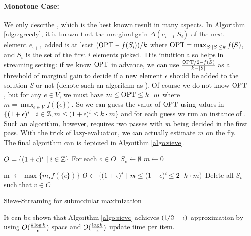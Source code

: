\paragraph{Monotone Case:} We only describe \cite{BMK+14}, which is the best known result in many aspects.  In Algorithm \ref{algo:greedy}, it is known that the marginal gain $\Delta(e_{i+1}|S_i)$ of the next element $e_{i+1}$ added is at least $(\text{OPT} - f(S_i))/k$ where $\text{OPT}=\max_{S:|S|\leq k} f(S)$, and $S_i$ is the set of the first $i$ elements picked. This intuition also helps in streaming setting: if we know $\text{OPT}$ in advance, we can use $\frac{\text{OPT}/2 - f(S)}{k - |S|}$ as a  threshold of marginal gain to decide if a new element $e$ should be added to the solution $S$ or not (denote such an algorithm as \knowopt). Of course we do not know $\text{OPT}$, but for any $e\in V$, we must have $m \leq \text{OPT} \leq k\cdot m$ where $m = \max_{e\in V}f(\{e\})$. So we can guess the value of $\text{OPT}$ using values in $\{(1 + \epsilon)^i~|~i\in\mathbb{Z}, m\leq (1 + \epsilon)^i \leq k\cdot m\}$ and for each guess we run an instance of \knowopt. Such an algorithm, however, requires two passes with $m$ being decided in the first pass. With the trick of lazy-evaluation, we can actually estimate $m$ on the fly. The final algorithm can is depicted in Algorithm \ref{algo:sieve}.

\begin{algorithm}[H]
\DontPrintSemicolon %
$O = \{(1 + \epsilon)^i~|~i\in \mathbb{Z}\}$\;
\;
For each $v\in O, ~S_v \gets \emptyset$\;
$m \gets 0$\;

 {
  m $\gets \max\{m, f(\{e\})\}$\;
  $O\gets \{(1 + \epsilon)^i~|~m \leq (1 + \epsilon)^i \leq 2\cdot k \cdot m\}$\;
  Delete all $S_v$ such that $v \in O$\;
}
\;
\caption{{\sc Sieve-Streaming} for submodular maximization}
\label{algo:sieve}
\end{algorithm}

It can be shown that Algorithm \ref{algo:sieve} achieves $(1/2-\epsilon)$-approximation by using $O(\frac{k \log k}{\epsilon})$ space and $O(\frac{\log k}{\epsilon})$ update time per item.


